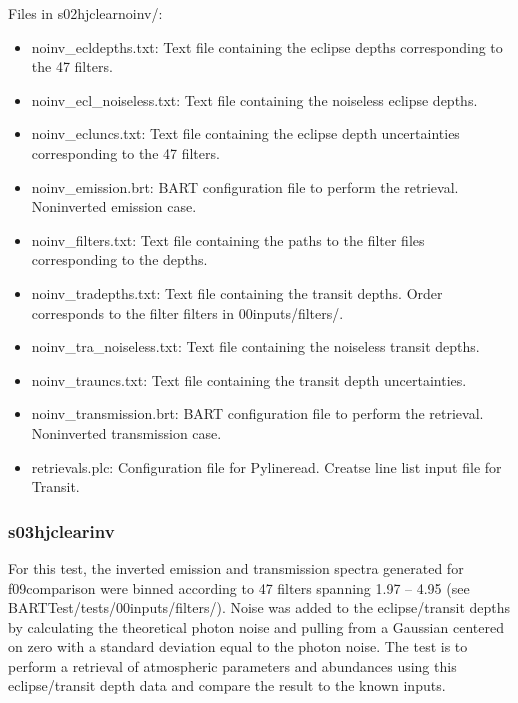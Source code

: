 \documentclass[letterpaper, 12pt]{article}
\begin{document}
Files in s02hjclearnoinv/:
\begin{itemize} \itemsep0pt
  \item noinv{\_}ecldepths.txt: Text file containing the eclipse depths 
        corresponding to the 47 filters.
  \item noinv{\_}ecl{\_}noiseless.txt: Text file containing the noiseless eclipse depths.
  \item noinv{\_}ecluncs.txt: Text file containing the eclipse depth 
        uncertainties corresponding to the 47 filters.
  \item noinv{\_}emission.brt: BART configuration file to perform the 
        retrieval. Noninverted emission case.
  \item noinv{\_}filters.txt: Text file containing the paths to the filter files corresponding to the depths.
  \item noinv{\_}tradepths.txt: Text file containing the transit depths. Order 
        corresponds to the filter filters in 00inputs/filters/.
  \item noinv{\_}tra{\_}noiseless.txt: Text file containing the noiseless transit depths.
  \item noinv{\_}trauncs.txt: Text file containing the transit depth 
        uncertainties. 
  \item noinv{\_}transmission.brt: BART configuration file to perform the 
        retrieval. Noninverted transmission case.
  \item retrievals.plc: Configuration file for Pylineread. Creatse line list input file for Transit.
\end{itemize}

\subsubsection{s03hjclearinv}
For this test, the inverted emission and transmission spectra generated for 
f09comparison were binned according to 47 filters spanning 
1.97 -- 4.95 \microns (see BARTTest/tests/00inputs/filters/). 
Noise was added to the eclipse/transit 
depths by calculating the theoretical photon noise and pulling from a Gaussian 
centered on zero with a standard deviation equal to the photon noise. The test 
is to perform a retrieval of atmospheric parameters and abundances using this 
eclipse/transit depth data and compare the result to the known inputs.\\
\end{document}
